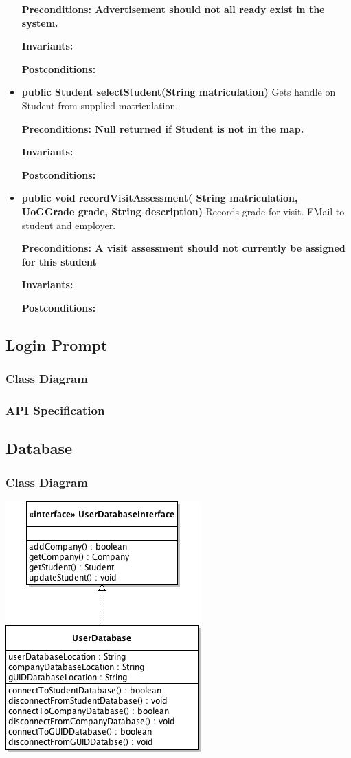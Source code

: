 \documentclass[11pt]{article}
\begin{document}
\begin{itemize}
{\textbf{Preconditions: Advertisement should not all ready exist in the
  system.}

\textbf{Invariants:} 

\textbf{Postconditions:} }
\item{\textbf{public Student selectStudent(String matriculation)}
Gets handle on Student from supplied matriculation.

\textbf{Preconditions: Null returned if Student is not in the map.}

\textbf{Invariants:} 

\textbf{Postconditions:} }
\item{\textbf{public void recordVisitAssessment( String matriculation,
    UoGGrade grade, String description)}
Records grade for visit. EMail to student and employer.

\textbf{Preconditions: A visit assessment should not currently be
  assigned for this student}

\textbf{Invariants:} 

\textbf{Postconditions:} }

\end{itemize}
\subsection{Login Prompt}

\subsubsection{Class Diagram}

\subsubsection{API Specification}

\subsection{Database}

\subsubsection{Class Diagram}

\includegraphics{databaseClassDiagram.png}
\end{document}
